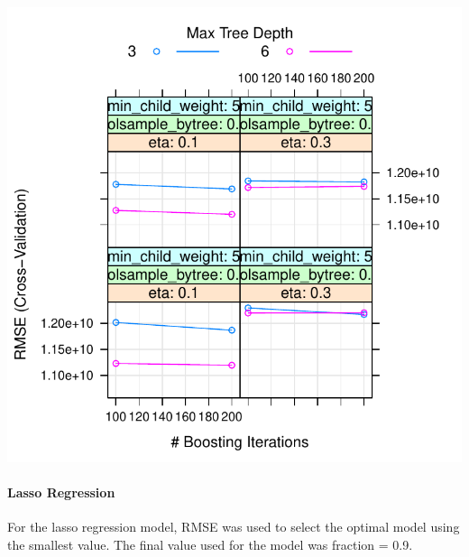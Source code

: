 \documentclass[11pt,]{article}
\begin{document}
\begin{center}\includegraphics{stock_analysis_files/figure-latex/XGBoost-3} \end{center}

\hypertarget{lasso-regression}{%
\paragraph{\texorpdfstring{\textbf{Lasso Regression}\\
}{Lasso Regression }}\label{lasso-regression}}

For the lasso regression model, RMSE was used to select the optimal
model using the smallest value. The final value used for the model was
fraction = 0.9.
\end{document}
